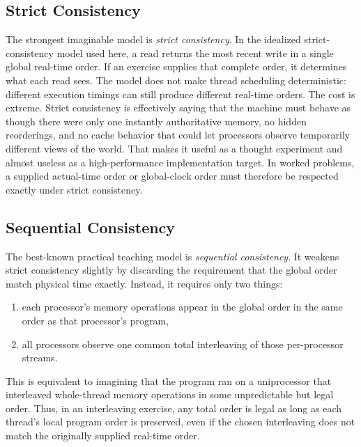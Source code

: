 \subsection*{Strict Consistency}
The strongest imaginable model is \textit{strict consistency}.
In the idealized strict-consistency model used here, a read returns the most recent write in a single global real-time order.
If an exercise supplies that complete order, it determines what each read sees.
The model does not make thread scheduling deterministic: different execution timings can still produce different real-time orders.
The cost is extreme.
Strict consistency is effectively saying that the machine must behave as though there were only one instantly authoritative memory, no hidden reorderings, and no cache behavior that could let processors observe temporarily different views of the world.
That makes it useful as a thought experiment and almost useless as a high-performance implementation target.
In worked problems, a supplied actual-time order or global-clock order must therefore be respected exactly under strict consistency.

\subsection*{Sequential Consistency}
The best-known practical teaching model is \textit{sequential consistency}.
It weakens strict consistency slightly by discarding the requirement that the global order match physical time exactly.
Instead, it requires only two things:
\begin{enumerate}
    \item each processor's memory operations appear in the global order in the same order as that processor's program,
    \item all processors observe one common total interleaving of those per-processor streams.
\end{enumerate}
This is equivalent to imagining that the program ran on a uniprocessor that interleaved whole-thread memory operations in some unpredictable but legal order.
Thus, in an interleaving exercise, any total order is legal as long as each thread's local program order is preserved, even if the chosen interleaving does not match the originally supplied real-time order.


